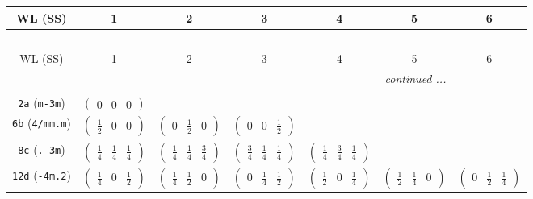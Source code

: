 \documentclass[fleqn,9pt,landscape]{jsarticle}
\begin{document}
\begin{center}
\renewcommand{\arraystretch}{1.2}
\begin{longtable}{ccccccc}
 \hline \hline
WL (SS) & 1 & 2 & 3 & 4 & 5 & 6 \\ \hline \endfirsthead

\multicolumn{6}{l}{\tablename\ \thetable{}} \\
 \hline \hline
WL (SS) & 1 & 2 & 3 & 4 & 5 & 6 \\ \hline \endhead

 \hline \hline
\multicolumn{6}{r}{\footnotesize\it continued ...} \\ \endfoot

 \hline \hline
\multicolumn{6}{r}{} \\ \endlastfoot

{\tt 2a} ({\tt m-3m}) & $ \begin{pmatrix} 0 & 0 & 0 \end{pmatrix} $ & $  $ & $  $ & $  $ & $  $ & $  $ \\ \hline
{\tt 6b} ({\tt 4/mm.m}) & $ \begin{pmatrix} \frac{1}{2} & 0 & 0 \end{pmatrix} $ & $ \begin{pmatrix} 0 & \frac{1}{2} & 0 \end{pmatrix} $ & $ \begin{pmatrix} 0 & 0 & \frac{1}{2} \end{pmatrix} $ & $  $ & $  $ & $  $ \\ \hline
{\tt 8c} ({\tt .-3m}) & $ \begin{pmatrix} \frac{1}{4} & \frac{1}{4} & \frac{1}{4} \end{pmatrix} $ & $ \begin{pmatrix} \frac{1}{4} & \frac{1}{4} & \frac{3}{4} \end{pmatrix} $ & $ \begin{pmatrix} \frac{3}{4} & \frac{1}{4} & \frac{1}{4} \end{pmatrix} $ & $ \begin{pmatrix} \frac{1}{4} & \frac{3}{4} & \frac{1}{4} \end{pmatrix} $ & $  $ & $  $ \\ \hline
{\tt 12d} ({\tt -4m.2}) & $ \begin{pmatrix} \frac{1}{4} & 0 & \frac{1}{2} \end{pmatrix} $ & $ \begin{pmatrix} \frac{1}{4} & \frac{1}{2} & 0 \end{pmatrix} $ & $ \begin{pmatrix} 0 & \frac{1}{4} & \frac{1}{2} \end{pmatrix} $ & $ \begin{pmatrix} \frac{1}{2} & 0 & \frac{1}{4} \end{pmatrix} $ & $ \begin{pmatrix} \frac{1}{2} & \frac{1}{4} & 0 \end{pmatrix} $ & $ \begin{pmatrix} 0 & \frac{1}{2} & \frac{1}{4} \end{pmatrix} $ \\ \hline

\end{longtable}
\end{center}
\end{document}

